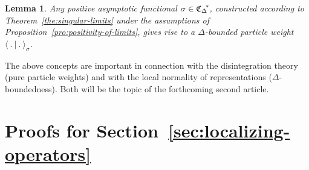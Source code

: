 \documentclass[a4paper,a4paper]{article}
\numberwithin{equation}{section}
\newcommand{\CDstar}{{\mathfrak{C}_\Delta}^{\negthickspace *}}
\theoremstyle{definition}
\theoremstyle{plain}
\newtheorem{lemma}[definition]{Lemma}
\theoremstyle{remark}
\newcommand{\scp}[2]{\langle #1 \vert #2 \rangle}
\begin{document}
  \begin{lemma}
    \label{lem:Delta-bound}
    Any positive asymptotic functional $\sigma \in \CDstar$,
    constructed according to Theorem~\ref{the:singular-limits} under
    the assumptions of Proposition~\ref{pro:positivity-of-limits},
    gives rise to a $\Delta$-bounded particle weight
    $\scp{~.~}{~.~}_\sigma$.
  \end{lemma}
  The above concepts are important in connection with the
  disintegration theory (pure particle weights) and with the local
  normality of representations ($\Delta$-boundedness). Both will be
  the topic of the forthcoming second article.


\section{Proofs for Section~\ref{sec:localizing-operators}}
  \label{sec:locop-proofs}
\end{document}
